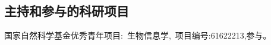 \ifblindreview
\else
\subsection*{主持和参与的科研项目}
\begin{enumerate}[label={[\arabic*]}]
\item 国家自然科学基金优秀青年项目:~生物信息学,~项目编号:61622213,参与。

\end{enumerate}

\fi

\newpage

\ifblindreview
\else

\newpage
\fi